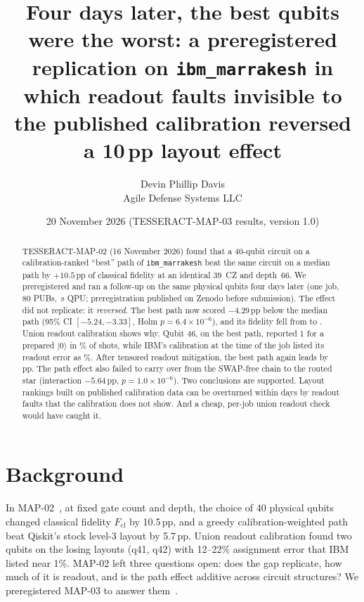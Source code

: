 \documentclass[10pt,twocolumn]{article}
\title{\bfseries Four days later, the best qubits were the worst: a preregistered replication on
\texttt{ibm\_marrakesh} in which readout faults invisible to the published calibration reversed a
10\,pp layout effect}
\author{Devin Phillip Davis\\ \small Agile Defense Systems LLC}
\date{20 November 2026 \quad (TESSERACT-MAP-03 results, version 1.0)}
\begin{document}
\maketitle

\begin{abstract}
\noindent
TESSERACT-MAP-02 (16 November 2026) found that a 40-qubit circuit on a calibration-ranked ``best''
path of \texttt{ibm\_marrakesh} beat the same circuit on a median path by $+10.5$\,pp of classical
fidelity at an identical 39~CZ and depth~66. We preregistered and ran a follow-up on the same physical
qubits four days later (one job, 80 PUBs, \QpuSeconds{}\,s QPU; preregistration published on Zenodo
before submission). The effect did not replicate: it \emph{reversed}. The best path now scored
$-4.29$\,pp below the median path (95\% CI $[-5.24,-3.33]$, Holm $p=6.4\times10^{-6}$), and its
fidelity fell from \MtwoCfive{} to \Aone. Union readout calibration shows why. Qubit 46, on the best
path, reported 1 for a prepared $|0\rangle$ in \QFSixP\% of shots, while IBM's calibration at the
time of the job listed its readout error as \QFSixIBM\%. After tensored readout mitigation, the best
path again leads by \MitGap\,pp. The path effect also failed to carry over from the SWAP-free chain
to the routed star (interaction $-5.64$\,pp, $p=1.0\times10^{-6}$). Two conclusions are
supported. Layout rankings built on published calibration data can be overturned within days by
readout faults that the calibration does not show. And a cheap, per-job union readout check would
have caught it.
\end{abstract}

\section{Background}
In MAP-02~\cite{map02}, at fixed gate count and depth, the choice of 40 physical qubits changed
classical fidelity $F_{\mathrm{cl}}$ by 10.5\,pp, and a greedy calibration-weighted path beat Qiskit's
stock level-3 layout by 5.7\,pp. Union readout calibration found two qubits on the losing layouts
(q41, q42) with 12--22\% assignment error that IBM listed near 1\%. MAP-02 left three questions open:
does the gap replicate, how much of it is readout, and is the path effect additive across circuit
structures? We preregistered MAP-03 to answer them~\cite{prereg}.
\end{document}
